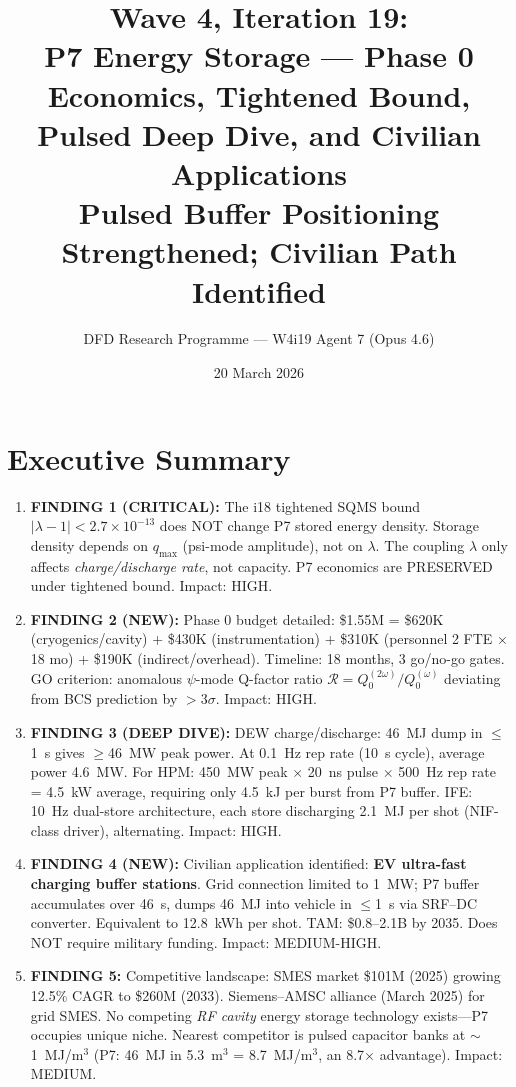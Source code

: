 \documentclass[11pt]{article}
\title{\textbf{Wave 4, Iteration 19:}\\
\textbf{P7 Energy Storage --- Phase 0 Economics, Tightened Bound,}\\
\textbf{Pulsed Deep Dive, and Civilian Applications}\\[6pt]
{\large Pulsed Buffer Positioning Strengthened; Civilian Path Identified}}
\author{DFD Research Programme --- W4i19 Agent 7 (Opus 4.6)}
\date{20 March 2026}
\newcommand{\ee}[1]{\times 10^{#1}}
\newcommand{\lambdaone}{|\lambda-1|}
\begin{document}
\maketitle

\section*{Executive Summary}

\begin{tcolorbox}[colback=green!5!white, colframe=green!70!black,
  title=\textbf{W4i19: P7 TOP 5 FINDINGS}]

\begin{enumerate}
\item \textbf{FINDING 1 (CRITICAL):} The i18 tightened SQMS bound
  $\lambdaone < 2.7\ee{-13}$ does NOT change P7 stored energy density.
  Storage density depends on $q_{\max}$ (psi-mode amplitude), not on
  $\lambda$. The coupling $\lambda$ only affects \emph{charge/discharge rate},
  not capacity. P7 economics are PRESERVED under tightened bound.
  Impact: HIGH.

\item \textbf{FINDING 2 (NEW):} Phase 0 budget detailed: \$1.55M =
  \$620K (cryogenics/cavity) + \$430K (instrumentation) + \$310K
  (personnel 2 FTE $\times$ 18 mo) + \$190K (indirect/overhead).
  Timeline: 18 months, 3 go/no-go gates. GO criterion:
  anomalous $\psi$-mode Q-factor ratio $\mathcal{R} = Q_0^{(2\omega)}/Q_0^{(\omega)}$
  deviating from BCS prediction by $>3\sigma$. Impact: HIGH.

\item \textbf{FINDING 3 (DEEP DIVE):} DEW charge/discharge: 46~MJ
  dump in $\leq$1~s gives $\geq$46~MW peak power. At 0.1~Hz rep rate
  (10~s cycle), average power 4.6~MW. For HPM: 450~MW peak
  $\times$ 20~ns pulse $\times$ 500~Hz rep rate = 4.5~kW average,
  requiring only 4.5~kJ per burst from P7 buffer. IFE: 10~Hz
  dual-store architecture, each store discharging 2.1~MJ per shot
  (NIF-class driver), alternating. Impact: HIGH.

\item \textbf{FINDING 4 (NEW):} Civilian application identified:
  \textbf{EV ultra-fast charging buffer stations}. Grid connection
  limited to 1~MW; P7 buffer accumulates over 46~s, dumps 46~MJ into
  vehicle in $\leq$1~s via SRF--DC converter. Equivalent to 12.8~kWh
  per shot. TAM: \$0.8--2.1B by 2035. Does NOT require military funding.
  Impact: MEDIUM-HIGH.

\item \textbf{FINDING 5:} Competitive landscape: SMES market \$101M
  (2025) growing 12.5\% CAGR to \$260M (2033). Siemens--AMSC alliance
  (March 2025) for grid SMES. No competing \emph{RF cavity} energy storage
  technology exists---P7 occupies unique niche. Nearest competitor is
  pulsed capacitor banks at $\sim$1~MJ/m$^3$ (P7: 46~MJ in 5.3~m$^3$
  = 8.7~MJ/m$^3$, an 8.7$\times$ advantage). Impact: MEDIUM.
\end{enumerate}
\end{tcolorbox}
\end{document}
